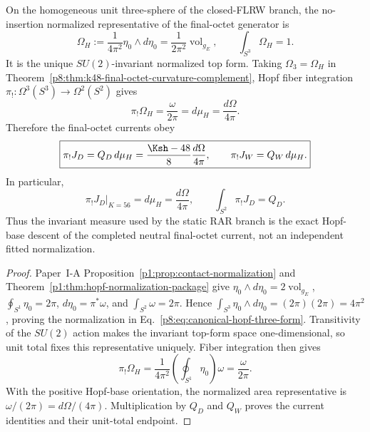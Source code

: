 \documentclass[12pt,a4paper]{article}
\begin{document}
\begin{theorem}
\label{p8:thm:final-octet-canonical-hopf-descent}
On the homogeneous unit three-sphere of the closed-FLRW branch, the
no-insertion normalized representative of the final-octet generator is
\begin{equation}
 \label{p8:eq:canonical-hopf-three-form}
 \boxed{
 \Omega_H
 :=\frac{1}{4\pi^2}\eta_0\wedge d\eta_0
 =\frac{1}{2\pi^2}\operatorname{vol}_{g_E},
 \qquad
 \int_{S^3}\Omega_H=1.}
\end{equation}
It is the unique \(SU(2)\)-invariant normalized top form.  Taking
\(\Omega_3=\Omega_H\) in
Theorem~\ref{p8:thm:k48-final-octet-curvature-complement}, Hopf fiber
integration \(\pi_!:\Omega^3(S^3)\to\Omega^2(S^2)\) gives
\begin{equation}
 \label{p8:eq:canonical-hopf-pushforward}
 \boxed{
 \pi_!\Omega_H
 =\frac{\omega}{2\pi}
 =d\mu_H
 =\frac{d\Omega}{4\pi}.}
\end{equation}
Therefore the final-octet currents obey
\begin{equation}
 \label{p8:eq:final-octet-current-hopf-descent}
 \boxed{
 \pi_!J_D
 =Q_D\,d\mu_H
 =\frac{\Ksh-48}{8}\frac{d\Omega}{4\pi},
 \qquad
 \pi_!J_W
 =Q_W\,d\mu_H.}
\end{equation}
In particular,
\begin{equation}
 \label{p8:eq:terminal-dark-current-rar-measure}
 \boxed{
 \left.\pi_!J_D\right|_{K=56}=d\mu_H=\frac{d\Omega}{4\pi}},
 \qquad
 \int_{S^2}\pi_!J_D=Q_D.
\end{equation}
Thus the invariant measure used by the static RAR branch is the exact Hopf-base
descent of the completed neutral final-octet current, not an independent fitted
normalization.
\end{theorem}

\begin{proof}
Paper~I-A Proposition~\ref{p1:prop:contact-normalization} and
Theorem~\ref{p1:thm:hopf-normalization-package} give
\(\eta_0\wedge d\eta_0=2\operatorname{vol}_{g_E}\),
\(\oint_{S^1}\eta_0=2\pi\),
\(d\eta_0=\pi^*\omega\), and \(\int_{S^2}\omega=2\pi\).  Hence
\(\int_{S^3}\eta_0\wedge d\eta_0=(2\pi)(2\pi)=4\pi^2\), proving the
normalization in Eq.~\eqref{p8:eq:canonical-hopf-three-form}.  Transitivity of
the \(SU(2)\) action makes the invariant top-form space one-dimensional, so
unit total fixes this representative uniquely.  Fiber integration then gives
\[
 \pi_!\Omega_H
 =\frac1{4\pi^2}
 \left(\oint_{S^1}\eta_0\right)\omega
 =\frac{\omega}{2\pi}.
\]
With the positive Hopf-base orientation, the normalized area representative is
\(\omega/(2\pi)=d\Omega/(4\pi)\).  Multiplication by \(Q_D\) and \(Q_W\)
proves the current identities and their unit-total endpoint.
\end{proof}
\end{document}

